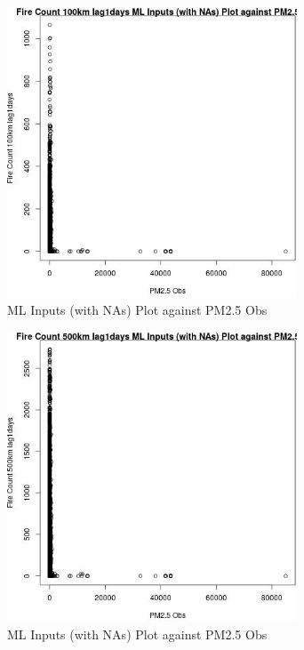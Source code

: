 \begin{figure} 
\centering  
\includegraphics[width=0.77\textwidth]{Code_Outputs/Report_ML_input_PM25_Step4_part_f_de_duplicated_aves_prioritize_24hr_obswNAs_Fire_Count_100km_lag1daysvPM25_Obs.jpg} 
\caption{\label{fig:Report_ML_input_PM25_Step4_part_f_de_duplicated_aves_prioritize_24hr_obswNAsFire_Count_100km_lag1daysvPM25_Obs}ML Inputs (with NAs) Plot against PM2.5 Obs} 
\end{figure} 
 

\begin{figure} 
\centering  
\includegraphics[width=0.77\textwidth]{Code_Outputs/Report_ML_input_PM25_Step4_part_f_de_duplicated_aves_prioritize_24hr_obswNAs_Fire_Count_500km_lag1daysvPM25_Obs.jpg} 
\caption{\label{fig:Report_ML_input_PM25_Step4_part_f_de_duplicated_aves_prioritize_24hr_obswNAsFire_Count_500km_lag1daysvPM25_Obs}ML Inputs (with NAs) Plot against PM2.5 Obs} 
\end{figure} 
 

